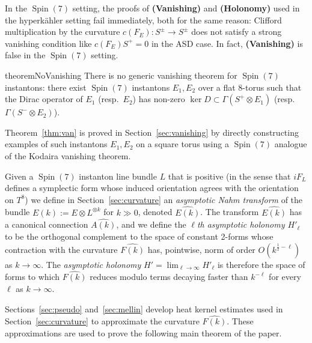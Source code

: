 \documentclass{article}
\newcommand{\wh}{\widehat}
\DeclareMathOperator\Spin{Spin}
\theoremstyle{definition}
\theoremstyle{remark}
\begin{document}
In the $\Spin(7)$ setting, the proofs of \textbf{(Vanishing)} and \textbf{(Holonomy)} used in the hyperk\"ahler setting fail immediately, both for the same reason: Clifford multiplication by the curvature $c(F_E) \colon S^\pm \to S^\pm$ does not satisfy a strong vanishing condition like $c(F_E) S^+ = 0$ in the ASD case.
In fact, \textbf{(Vanishing)} is false in the $\Spin(7)$ setting.
\begin{restatable}{theorem}{NoVanishing}
    \label{thm:van}
    There is no generic vanishing theorem for $\Spin(7)$ instantons: there exist $\Spin(7)$ instantons $E_1, E_2$ over a flat 8-torus such that the Dirac operator of $E_1$ (resp.\ $E_2$) has non-zero $\ker D \subset \Gamma(S^+ \otimes E_1)$ (resp.\ $\Gamma(S^- \otimes E_2)$).
\end{restatable}
Theorem~\ref{thm:van} is proved in Section~\ref{sec:vanishing} by directly constructing examples of such instantons $E_1, E_2$ on a square torus using a $\Spin(7)$ analogue of the Kodaira vanishing theorem.

Given a $\Spin(7)$ instanton line bundle $L$ that is positive (in the sense that $i F_L$ defines a symplectic form whose induced orientation agrees with the orientation on $T^8$) we define in Section~\ref{sec:curvature} an \emph{asymptotic Nahm transform} of the bundle $E(k) := E \otimes L^{\otimes k}$ for $k \gg 0$, denoted $\wh{E(k)}$.
The transform $\wh{E(k)}$ has a canonical connection $\wh{A(k)}$, and we define the \emph{$\ell$th asymptotic holonomy $H'_\ell$} to be the orthogonal complement to the space of constant 2-forms whose contraction with the curvature $\wh{F(k)}$ has, pointwise, norm of order $O(k^{\tfrac12-\ell})$ as $k \to \infty$.
The \emph{asymptotic holonomy} $H' = \lim_{\ell \to \infty} H'_\ell$ is therefore the space of forms to which $\wh{F(k)}$ reduces modulo terms decaying faster than $k^{-\ell}$ for every $\ell$ as $k\to \infty$.

Sections~\ref{sec:pseudo} and~\ref{sec:mellin} develop heat kernel estimates used in Section~\ref{sec:curvature} to approximate the curvature $\wh{F(k)}$.
These approximations are used to prove the following main theorem of the paper.
\end{document}

